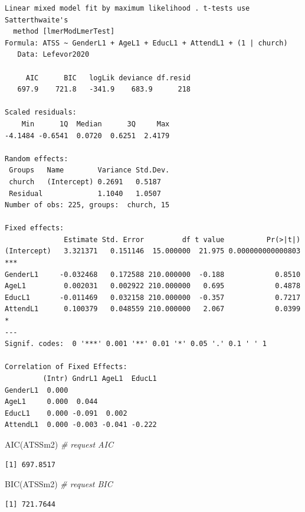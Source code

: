 \documentclass[
  11pt,
]{book}
\newenvironment{Shaded}{\begin{snugshade}}{\end{snugshade}}
\newcommand{\CommentTok}[1]{\textcolor[rgb]{0.56,0.35,0.01}{\textit{#1}}}
\newcommand{\FunctionTok}[1]{\textcolor[rgb]{0.00,0.00,0.00}{#1}}
\newcommand{\NormalTok}[1]{#1}
\begin{document}
\begin{verbatim}
Linear mixed model fit by maximum likelihood . t-tests use Satterthwaite's
  method [lmerModLmerTest]
Formula: ATSS ~ GenderL1 + AgeL1 + EducL1 + AttendL1 + (1 | church)
   Data: Lefevor2020

     AIC      BIC   logLik deviance df.resid 
   697.9    721.8   -341.9    683.9      218 

Scaled residuals: 
    Min      1Q  Median      3Q     Max 
-4.1484 -0.6541  0.0720  0.6251  2.4179 

Random effects:
 Groups   Name        Variance Std.Dev.
 church   (Intercept) 0.2691   0.5187  
 Residual             1.1040   1.0507  
Number of obs: 225, groups:  church, 15

Fixed effects:
              Estimate Std. Error         df t value          Pr(>|t|)    
(Intercept)   3.321371   0.151146  15.000000  21.975 0.000000000000803 ***
GenderL1     -0.032468   0.172588 210.000000  -0.188            0.8510    
AgeL1         0.002031   0.002922 210.000000   0.695            0.4878    
EducL1       -0.011469   0.032158 210.000000  -0.357            0.7217    
AttendL1      0.100379   0.048559 210.000000   2.067            0.0399 *  
---
Signif. codes:  0 '***' 0.001 '**' 0.01 '*' 0.05 '.' 0.1 ' ' 1

Correlation of Fixed Effects:
         (Intr) GndrL1 AgeL1  EducL1
GenderL1  0.000                     
AgeL1     0.000  0.044              
EducL1    0.000 -0.091  0.002       
AttendL1  0.000 -0.003 -0.041 -0.222
\end{verbatim}

\begin{Shaded}
\begin{Highlighting}[]
\FunctionTok{AIC}\NormalTok{(ATSSm2) }\CommentTok{\# request AIC}
\end{Highlighting}
\end{Shaded}

\begin{verbatim}
[1] 697.8517
\end{verbatim}

\begin{Shaded}
\begin{Highlighting}[]
\FunctionTok{BIC}\NormalTok{(ATSSm2) }\CommentTok{\# request BIC}
\end{Highlighting}
\end{Shaded}

\begin{verbatim}
[1] 721.7644
\end{verbatim}
\end{document}
